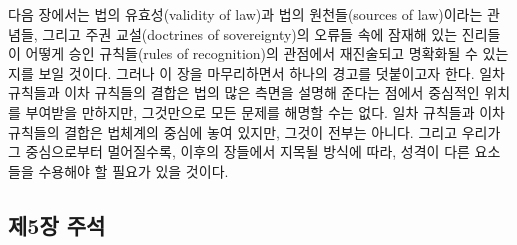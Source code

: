 다음 장에서는 법의 유효성(validity of law)과 법의 원천들(sources of
law)이라는 관념들, 그리고 주권 교설(doctrines of sovereignty)의 오류들
속에 잠재해 있는 진리들이 어떻게 승인 규칙들(rules of recognition)의
관점에서 재진술되고 명확화될 수 있는지를 보일 것이다. 그러나 이 장을
마무리하면서 하나의 경고를 덧붙이고자 한다. 일차 규칙들과 이차 규칙들의
결합은 법의 많은 측면을 설명해 준다는 점에서 중심적인 위치를 부여받을
만하지만, 그것만으로 모든 문제를 해명할 수는 없다. 일차 규칙들과 이차
규칙들의 결합은 법체계의 중심에 놓여 있지만, 그것이 전부는 아니다.
그리고 우리가 그 중심으로부터 멀어질수록, 이후의 장들에서 지목될 방식에
따라, 성격이 다른 요소들을 수용해야 할 필요가 있을 것이다.

\newpage

\subsection{제5장 주석}\label{uxc81c5uxc7a5-uxc8fcuxc11d}


